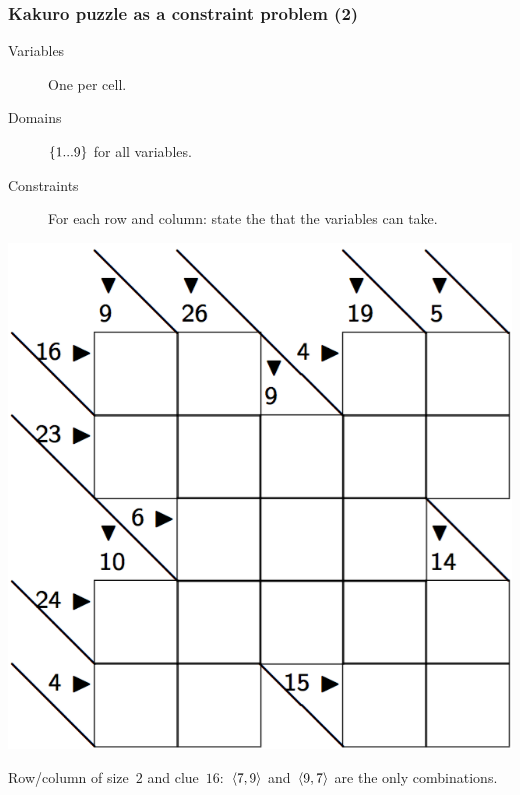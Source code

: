 \documentclass{beamer}
\newcommand{\stressed}[1]{\emph{{\color{red!50}{#1}}}}
\begin{document}
\begin{frame}
  \frametitle{Kakuro puzzle as a constraint problem (2)}
  \begin{minipage}{0.6\textwidth}
    \begin{description}
      \item[Variables] One per cell.
      \item[Domains] $\left\{1...9\right\}$ for all variables.
      \item[Constraints] For each row and column: state the \stressed{possible
        combinations of values} that the variables can take.
    \end{description} 
  \end{minipage}
  \begin{minipage}{0.35\textwidth}
    \includegraphics[scale=0.15]{kakuro.png}
  \end{minipage}

  \bigskip
  \bigskip
  Row/column of size~$2$ and clue~$16$:~$\left\langle7,9\right\rangle$ and~$\left\langle9,7\right\rangle$
  are the only combinations.
\end{frame}
\end{document}
